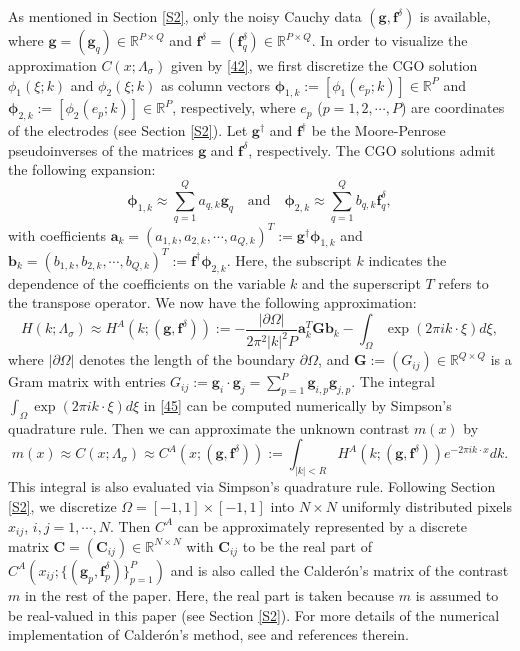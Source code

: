 \documentclass[11pt]{article}
\newcommand{\R}{{\mathbb R}}
\newcommand{\pa}{\partial}
\newcommand{\Calderon}{Calder\'{o}n}
\newcommand{\bds}[1]{\boldsymbol{#1}}
\begin{document}
As mentioned in Section \ref{S2}, only the noisy Cauchy data $ (\bds{g}, \bds{f}^\delta) $ is available, where $ \bds{g} = (\bds{g}_q)\in\R^{P\times Q} $ and $ \bds{f}^\delta = (\bds{f}_q^\delta)\in\R^{P\times Q} $.
In order to visualize the approximation $ C(x;\Lambda_\sigma) $ given by \eqref{42}, we first discretize the CGO solution $ \phi_1(\xi;k) $ and $ \phi_2(\xi;k) $ as column vectors $ \bds{\phi}_{1,k} := \left[\phi_1(e_p;k)\right]\in\R^P $ and $ \bds{\phi}_{2,k} := \left[\phi_2(e_p;k)\right]\in\R^P $, respectively, where $ e_p $ ($ p=1,2,\cdots,P $) are coordinates of the electrodes (see Section \ref{S2}).
Let $ \bds{g}^\dagger $ and $ \bds{f}^\dagger $ be the Moore-Penrose pseudoinverses of the matrices $ \bds{g} $ and $ \bds{f}^\delta $, respectively.
The CGO solutions admit the following expansion:
\begin{equation}\label{44}
\bds{\phi}_{1,k} \approx \sum_{q=1}^{Q}a_{q,k}\bds{g}_q\quad\text{and}\quad \bds{\phi}_{2,k} \approx \sum_{q=1}^{Q}b_{q,k}\bds{f}_q^\delta,
\end{equation}
with coefficients $ \bds{a}_k = (a_{1,k}, a_{2,k}, \cdots, a_{Q,k})^T := \bds{g}^\dagger\bds{\phi}_{1,k} $ and $ \bds{b}_k = (b_{1,k}, b_{2,k}, \cdots, b_{Q,k})^T := \bds{f}^\dagger\bds{\phi}_{2,k} $.
Here, the subscript $ k $ indicates the dependence of the coefficients on the variable $ k $ and the superscript $ T $ refers to the transpose operator.
We now have the following approximation:
\begin{equation}\label{45}
H(k;\Lambda_{\sigma})\approx H^A\left(k; (\bds{g}, \bds{f}^\delta)\right) := -\dfrac{|\pa\Omega|}{2\pi^2|k|^2P}\bds{a}_k^T\bds{G}\bds{b}_k - \int_\Omega\exp(2\pi ik\cdot \xi)d\xi,
\end{equation}
where $ |\pa\Omega| $ denotes the length of the boundary $ \pa\Omega $, and $ \bds{G} := (G_{ij})\in\R^{Q\times Q} $ is a Gram matrix with entries $ G_{ij} := \bds{g}_i\cdot\bds{g}_j= \sum_{p=1}^{P}\bds{g}_{i,p}\bds{g}_{j,p} $.
The integral $ \int_\Omega\exp(2\pi ik\cdot \xi)d\xi $ in \eqref{45} can be computed numerically by Simpson's quadrature rule.
Then we can approximate the unknown contrast $ m(x) $ by
\begin{equation}\label{46}
m(x)\approx C(x;\Lambda_\sigma)\approx C^A\left(x;(\bds{g}, \bds{f}^\delta)\right) := \int_{|k|<R}H^A\left(k; (\bds{g}, \bds{f}^\delta)\right)e^{-2\pi ik\cdot x}dk.
\end{equation}
This integral is also evaluated via Simpson's quadrature rule.
Following Section \ref{S2}, we discretize $ \Omega = [-1,1]\times [-1,1] $ into $ N\times N $ uniformly distributed pixels $ x_{ij} $, $ i,j=1,\cdots,N $.
Then $ C^A $ can be approximately represented by a discrete matrix $ \bds{C} = (\bds{C}_{ij})\in \R^{N\times N} $ with $ \bds{C}_{ij} $ to be the real part of $ C^A\left(x_{ij};\{(\bds{g}_p, \bds{f}_p^\delta)\}_{p=1}^P\right) $ and is also called the \Calderon's matrix of the contrast $ m $ in the rest of the paper.
Here, the real part is taken because $ m $ is assumed to be real-valued in this paper (see Section \ref{S2}).
For more details of the numerical implementation of \Calderon's method, see \cite{CSJ23, BJ09} and references therein.
\end{document}
